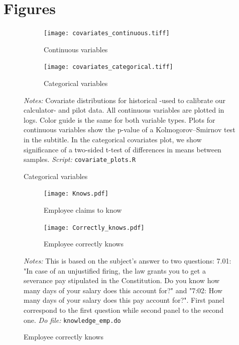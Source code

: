 \documentclass[11pt]{article}
\begin{document}

\section{Figures}

\begin{figure}[H]
\caption{Covariate distribution in Historical and Pilot data}
\label{covariate_distribution}
    \begin{center}
        \begin{subfigure}{0.49\textwidth}
            \caption{Continuous variables}
            \centering
            \texttt{[image: covariates\_continuous.tiff]}
        \end{subfigure}
        \begin{subfigure}{0.49\textwidth}
            \caption{Categorical variables}
            \centering
            \texttt{[image: covariates\_categorical.tiff]}
        \end{subfigure}
    \end{center}
    {\footnotesize \textit{Notes: } Covariate distributions for historical -used to calibrate our calculator- and pilot data. All continuous variables are plotted in logs. Color guide is the same for both variable types. Plots for continuous variables show the p-value of a Kolmogorov–Smirnov test in the subtitle. In the categorical covariates plot, we show significance of a two-sided t-test of differences in means between samples.}
    {\footnotesize \textit{Script: } \texttt{covariate\_plots.R}}
\end{figure}

\begin{figure}[H]
    \caption{Percent that know main legal constitutional entitlement - Pilot}
    \label{Knowindemfig}
    \begin{center}
        \begin{subfigure}{0.49\textwidth}
            \caption{Employee claims to know}
            \centering
            \texttt{[image: Knows.pdf]}
        \end{subfigure}
        \begin{subfigure}{0.49\textwidth}
            \caption{Employee correctly knows }
                \centering
                \texttt{[image: Correctly\_knows.pdf]}
        \end{subfigure}
        \end{center}
    {\footnotesize \textit{Notes: } This is based on the subject's answer to two questions: 7.01: "In case of an unjustified firing, the law grants you to get a severance pay stipulated in the Constitution. Do you know how many days of your salary does this account for?" and "7:02: How many days of your salary does this pay account for?". First panel correspond to the first question while second panel to the second one.}
    {\footnotesize \textit{Do file: } \texttt{knowledge\_emp.do}}
\end{figure}
\end{document}
